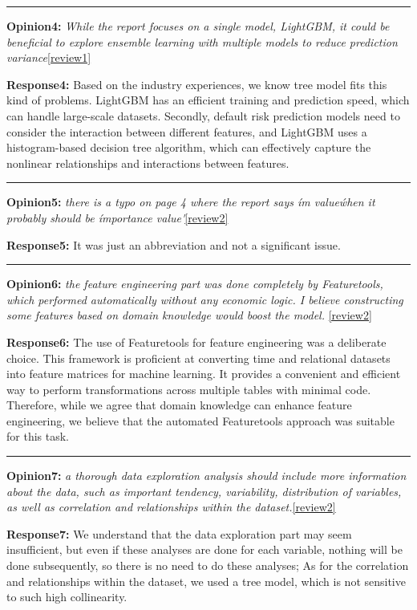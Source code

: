 \documentclass{article}
\begin{document}
\noindent\rule[0.5ex]{16cm}{1pt}

\textbf{Opinion4:} 
\textit{ While the report focuses on a single model, LightGBM, it could be beneficial to explore ensemble learning with multiple models to reduce prediction variance}\ref{review1}

\textbf{Response4:}
Based on the industry experiences, we know tree model fits this kind of problems.\cite{gupta2017analysis} LightGBM has an efficient training and prediction speed, which can handle large-scale datasets. Secondly, default risk prediction models need to consider the interaction between different features, and LightGBM uses a histogram-based decision tree algorithm, which can effectively capture the nonlinear relationships and interactions between features.

\noindent\rule[0.5ex]{16cm}{1pt}

\textbf{Opinion5:} 
\textit{there is a typo on page 4 where the report says \'im value\' when it probably should be \'importance value\'}\ref{review2}

\textbf{Response5:}
It was just an abbreviation and not a significant issue.

\noindent\rule[0.5ex]{16cm}{1pt}

\textbf{Opinion6:} 
\textit{the feature engineering part was done completely by Featuretools, which performed automatically without any economic logic. I believe constructing some features based on domain knowledge would boost the model. }\ref{review2}

\textbf{Response6:}
The use of Featuretools for feature engineering was a deliberate choice.\cite{schreck2018ai} This framework is proficient at converting time and relational datasets into feature matrices for machine learning. It provides a convenient and efficient way to perform transformations across multiple tables with minimal code. Therefore, while we agree that domain knowledge can enhance feature engineering, we believe that the automated Featuretools approach was suitable for this task.

\noindent\rule[0.5ex]{16cm}{1pt}

 \textbf{Opinion7:} 
\textit{a thorough data exploration analysis should include more information about the data, such as important tendency, variability, distribution of variables, as well as correlation and relationships within the dataset.}\ref{review2}

\textbf{Response7:}
We understand that the data exploration part may seem insufficient, but even if these analyses are done for each variable, nothing will be done subsequently, so there is no need to do these analyses; As for the correlation and relationships within the dataset, we used a tree model, which is not sensitive to such high collinearity\cite{TOMASCHEK2018249}.
\end{document}
